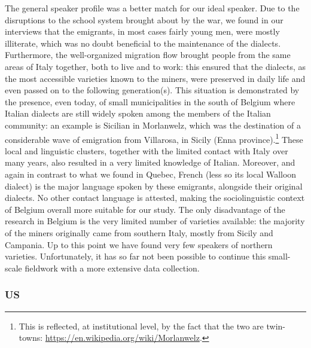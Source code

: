 \documentclass[output=paper,hidelinks]{langscibook}
\begin{document}
The general speaker profile was a better match for our ideal speaker. Due to the disruptions to the school system brought about by the war, we found in our interviews that the emigrants, in most cases fairly young men, were mostly illiterate, which was no doubt beneficial to the maintenance of the dialects. Furthermore, the well-organized migration flow brought people from the same areas of Italy together, both to live and to work: this ensured that the dialects, as the most accessible varieties known to the miners, were preserved in daily life and even passed on to the following generation(s). This situation is demonstrated by the presence, even today, of small municipalities in the south of Belgium where Italian dialects are still widely spoken among the members of the Italian community: an example is Sicilian in Morlanwelz, which was the destination of a considerable wave of emigration from Villarosa, in Sicily (Enna province).\footnote{This is reflected, at institutional level, by the fact that the two are twin-towns: \url{https://en.wikipedia.org/wiki/Morlanwelz}.} These local and linguistic clusters, together with the limited contact with Italy over many years, also resulted in a very limited knowledge of Italian. Moreover, and again in contrast to what we found in Quebec, French (less so its local Walloon dialect) is the major language spoken by these emigrants, alongside their original dialects. No other contact language is attested, making the sociolinguistic context of Belgium overall more suitable for our study. The only disadvantage of the research in Belgium is the very limited number of varieties available: the majority of the miners originally came from southern Italy, mostly from Sicily and Campania. Up to this point we have found very few speakers of northern varieties. Unfortunately, it has so far not been possible to continue this small-scale fieldwork with a more extensive data collection.

\subsubsection{US}
\end{document}
